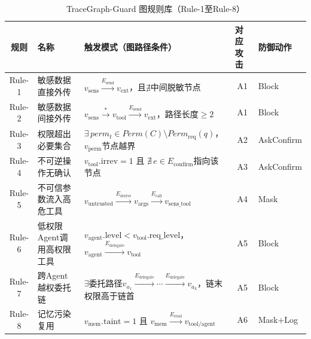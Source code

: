 \begin{table}[htbp]
\centering
\caption{TraceGraph-Guard 图规则库（Rule-1至Rule-8）}
\label{tab:graph_rules}
\small
\begin{tabular}{clp{4.6cm}cp{2.2cm}}
\toprule
\textbf{规则} & \textbf{名称} & \raggedright\arraybackslash\textbf{触发模式（图路径条件）} & \multicolumn{1}{l}{\textbf{对应攻击}} & \raggedright\arraybackslash\textbf{防御动作} \\
\midrule
Rule-1 & 敏感数据直接外传 &
  $v_{\text{sens}} \xrightarrow{E_{\text{send}}} v_{\text{ext}}$，且$\nexists$中间脱敏节点 &
  A1 & Block \\
Rule-2 & 敏感数据间接外传 &
  $v_{\text{sens}} \xrightarrow{*} v_{\text{tool}} \xrightarrow{E_{\text{send}}} v_{\text{ext}}$，路径长度$\geq 2$ &
  A1 & Block \\
Rule-3 & 权限超出必要集合 &
  $\exists\, perm_t \in Perm(C) \setminus Perm_{\text{req}}(q)$，$v_{\text{perm}}$节点越界 &
  A2 & AskConfirm \\
Rule-4 & 不可逆操作无确认 &
  $v_{\text{tool}}.\text{irrev}=1$ 且 $\nexists\, e \in E_{\text{confirm}}$指向该节点 &
  A3 & AskConfirm \\
Rule-5 & 不可信参数流入高危工具 &
  $v_{\text{untrusted}} \xrightarrow{E_{\text{derive}}} v_{\text{args}} \xrightarrow{E_{\text{call}}} v_{\text{sens\_tool}}$ &
  A4 & Mask \\
Rule-6 & 低权限Agent调用高权限工具 &
  $v_{\text{agent}}.\text{level} < v_{\text{tool}}.\text{req\_level}$，$v_{\text{agent}} \xrightarrow{E_{\text{delegate}}} v_{\text{tool}}$ &
  A5 & Block \\
Rule-7 & 跨Agent越权委托链 &
  $\exists$委托路径$v_{a_1} \xrightarrow{E_{\text{delegate}}} \cdots \xrightarrow{E_{\text{delegate}}} v_{a_k}$，链末权限高于链首 &
  A5 & Block \\
Rule-8 & 记忆污染复用 &
  $v_{\text{mem}}.\text{taint}=1$ 且 $v_{\text{mem}} \xrightarrow{E_{\text{read}}} v_{\text{tool/agent}}$ &
  A6 & Mask+Log \\
\bottomrule
\end{tabular}
\end{table}
